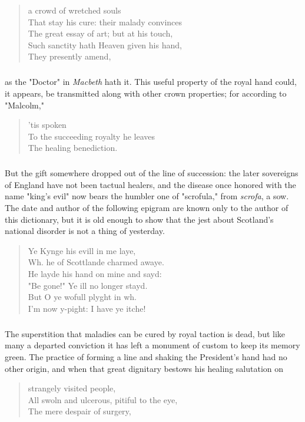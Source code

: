 \documentclass[11pt]{article}
\begin{document}
\begin{quote}                   a crowd of wretched souls \\
  That stay his cure:  their malady convinces \\
  The great essay of art; but at his touch, \\
  Such sanctity hath Heaven given his hand, \\
  They presently amend, 
\end{quote}
\subparagraph{} as the "Doctor" in {\em Macbeth} hath it.  This useful property of the
royal hand could, it appears, be transmitted along with other crown
properties; for according to "Malcolm,"

\begin{quote}                           'tis spoken \\
  To the succeeding royalty he leaves \\
  The healing benediction.
\end{quote}

\subparagraph{}  But the gift somewhere dropped out of the line of succession:  the
later sovereigns of England have not been tactual healers, and the
disease once honored with the name "king's evil" now bears the humbler
one of "scrofula," from {\em scrofa}, a sow.  The date and author of the
following epigram are known only to the author of this dictionary, but
it is old enough to show that the jest about Scotland's national
disorder is not a thing of yesterday.

\begin{quote}   Ye Kynge his evill in me laye, \\
  Wh. he of Scottlande charmed awaye. \\
  He layde his hand on mine and sayd: \\
  "Be gone!"  Ye ill no longer stayd. \\
  But O ye wofull plyght in wh. \\
  I'm now y-pight:  I have ye itche!
\end{quote}
  
\subparagraph{}  The superstition that maladies can be cured by royal taction is
dead, but like many a departed conviction it has left a monument of
custom to keep its memory green.  The practice of forming a line and
shaking the President's hand had no other origin, and when that great
dignitary bestows his healing salutation on

\begin{quote}                       strangely visited people, \\
  All swoln and ulcerous, pitiful to the eye, \\
  The mere despair of surgery,
\end{quote}
\end{document}
